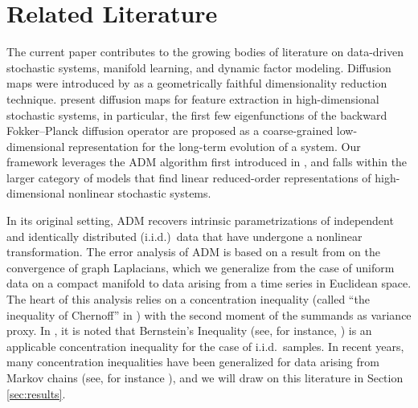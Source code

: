 \documentclass[11pt]{article}
\theoremstyle{plain}
\theoremstyle{definition}
\theoremstyle{remark}
\numberwithin{equation}{section}
\begin{document}
\section{Related Literature}
\label{sec:lit}
The current paper contributes to the growing bodies of literature on data-driven stochastic systems, manifold learning, and dynamic factor modeling.
Diffusion maps were introduced by \citet{coifman2006diffusion} as a geometrically faithful dimensionality reduction technique.
\citet{coifman2008diffusion} present diffusion maps for feature extraction in high-dimensional stochastic systems, in particular, the first few eigenfunctions of the backward Fokker--Planck diffusion operator are proposed as a coarse-grained low-dimensional representation for the long-term evolution of a system. Our framework leverages the ADM algorithm first introduced in \citet{singer2008nonlinear}, and falls within the larger category of models that find linear reduced-order representations of high-dimensional nonlinear stochastic systems. 

In its original setting, ADM recovers intrinsic parametrizations of independent and identically distributed (i.i.d.)~data that have undergone a nonlinear transformation. The error analysis of ADM is based on a result from \citet{singer_graph_2006} on the convergence of graph Laplacians, which we generalize from the case of uniform data on a compact manifold to data arising from a time series in Euclidean space. The heart of this analysis relies on a concentration inequality (called ``the inequality of Chernoff'' in \citet[paragraph before Equation (3.14)]{singer_graph_2006}) with the second moment of the summands as variance proxy. In \citet[Appendix B.1]{berry_variable_2016}, it is noted that Bernstein's Inequality (see, for instance, \citet[Section 2.8]{boucheron_concentration_2013}) is an applicable concentration inequality for the case of i.i.d.~samples. In recent years, many concentration inequalities have been generalized for data arising from Markov chains (see, for instance \citet{adamczak_tail_2008,douc_consistency_2011,miasojedow_hoeffdings_2014,paulin_concentration_2015,fan_hoeffdings_2021}), and we will draw on this literature in Section \ref{sec:results}.
\end{document}
